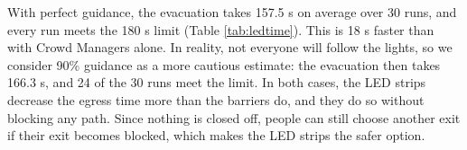 With perfect guidance, the evacuation takes 157.5 s on average over 30 runs, and every run meets the 180 s limit (Table \ref{tab:ledtime}). This is 18 s faster than with Crowd Managers alone. In reality, not everyone will follow the lights, so we consider 90\% guidance as a more cautious estimate: the evacuation then takes 166.3 s, and 24 of the 30 runs meet the limit. In both cases, the LED strips decrease the egress time more than the barriers do, and they do so without blocking any path. Since nothing is closed off, people can still choose another exit if their exit becomes blocked, which makes the LED strips the safer option.
